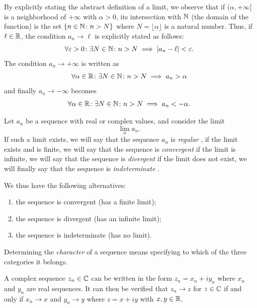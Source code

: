 By explicitly stating the abstract definition of a limit, we observe that if
$(\alpha,+\infty]$ is a neighborhood of $+\infty$ with $\alpha>0$, its
intersection with ${\mathbb N}$ (the domain of the function) is the set ${\left\{ n\in
{\mathbb N}\colon n> N \right\}}$ where $N=\lfloor \alpha \rfloor$ is a natural number. Thus, if
$\ell \in {\mathbb R}$, the condition $a_n \to \ell$ is explicitly stated as follows:
\begin{equation}\label{eq:limite_successione_convergente}
\forall \varepsilon>0\colon \exists N\in {\mathbb N}\colon n>N\implies {\left|a_n-\ell\right|} < \varepsilon.  
\end{equation}
The condition $a_n\to +\infty$ is written as
\[
  \forall \alpha\in {\mathbb R} \colon \exists N\in {\mathbb N} \colon n>N \implies a_n > \alpha  
\]
and finally $a_n\to-\infty$ becomes
\[
  \forall \alpha\in {\mathbb R} \colon \exists N\in {\mathbb N} \colon n>N \implies a_n < -\alpha.    
\]

\begin{definition}
Let $a_n$ be a sequence with real or complex values, and consider the limit 
\[
  \lim_n a_n.  
\]
If such a limit exists, we will say that the sequence $a_n$ is 
\emph{regular}%
%
,
%
if the limit exists and is finite, we will say that the sequence is 
\emph{convergent}%
%
%
if the limit is infinite, we will say that the sequence is 
\emph{divergent}%
%
%
if the limit does not exist, we will finally say that the sequence is
\emph{indeterminate}%
%
%
.

We thus have the following alternatives:
\begin{enumerate}
 \item the sequence is convergent (has a finite limit);
 \item the sequence is divergent (has an infinite limit);
 \item the sequence is indeterminate (has no limit).
\end{enumerate}
Determining the \emph{character}
%
%
%
of a sequence means specifying to which of the three categories it belongs.
\end{definition}

\begin{exercise}
A complex sequence $z_n\in {\mathbb C}$ can be written in the form $z_n = x_n + i y_n$
where $x_n$ and $y_n$ are real sequences. It can then be verified that $z_n\to
z$ for $z\in {\mathbb C}$ if and only if $x_n\to x$ and $y_n\to y$ where $z=x+ iy$ with
$x,y\in {\mathbb R}$.
\end{exercise}

